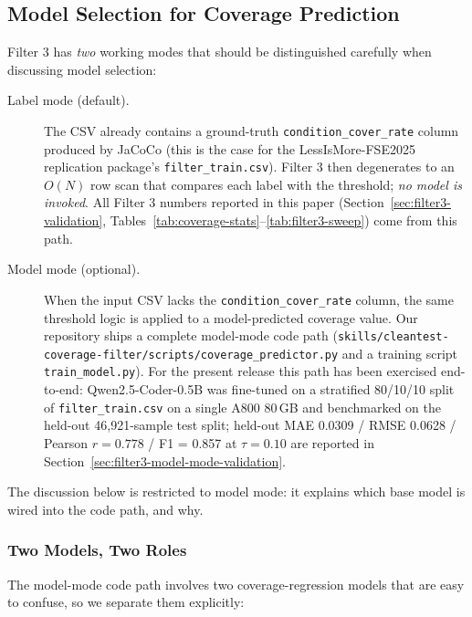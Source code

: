 \documentclass[acmlarge,nonacm,screen]{acmart}
\begin{document}
\subsection{Model Selection for Coverage Prediction}
\label{sec:model-selection}

Filter 3 has \emph{two} working modes that should be distinguished
carefully when discussing model selection:

\begin{description}
    \item[Label mode (default).] The CSV already contains a
        ground-truth \texttt{condition\_cover\_rate} column produced
        by JaCoCo (this is the case for the LessIsMore-FSE2025
        replication package's \texttt{filter\_train.csv}). Filter 3
        then degenerates to an $O(N)$ row scan that compares each
        label with the threshold; \emph{no model is invoked}. All
        Filter 3 numbers reported in this paper (Section~\ref{sec:filter3-validation},
        Tables~\ref{tab:coverage-stats}--\ref{tab:filter3-sweep}) come
        from this path.
    \item[Model mode (optional).] When the input CSV lacks the
        \texttt{condition\_cover\_rate} column, the same threshold
        logic is applied to a model-predicted coverage value. Our
        repository ships a complete model-mode code path
        (\texttt{skills/\allowbreak cleantest-coverage-filter/\allowbreak scripts/\allowbreak coverage\_predictor.py}
        and a training script \texttt{train\_model.py}). For the
        present release this path has been exercised end-to-end:
        Qwen2.5-Coder-0.5B was fine-tuned on a stratified 80/10/10
        split of \texttt{filter\_train.csv} on a single A800 80\,GB
        and benchmarked on the held-out 46{,}921-sample test split;
        held-out MAE 0.0309 / RMSE 0.0628 / Pearson $r = 0.778$ /
        F1 = 0.857 at $\tau = 0.10$ are reported in
        Section~\ref{sec:filter3-model-mode-validation}.
\end{description}

The discussion below is restricted to model mode: it explains which
base model is wired into the code path, and why.

\subsubsection{Two Models, Two Roles}

The model-mode code path involves two coverage-regression models that
are easy to confuse, so we separate them explicitly:
\end{document}
